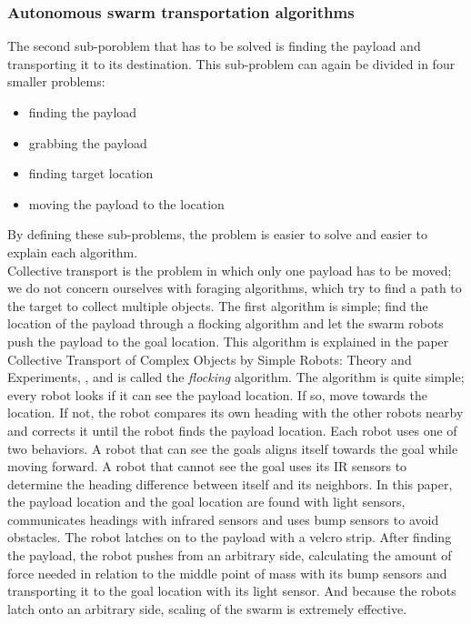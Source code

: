 \subsubsection{Autonomous swarm transportation algorithms}
The second sub-poroblem that has to be solved is finding the payload and transporting it to its destination.
This sub-problem can again be divided in four smaller problems:

\begin{itemize}
	\item finding the payload
	\item grabbing the payload
	\item finding target location
	\item moving the payload to the location
\end{itemize}

By defining these sub-problems, the problem is easier to solve and easier to explain each algorithm. \\

Collective transport is the problem in which only one payload has to be moved; we do not concern ourselves with foraging algorithms, which try to find a path to the target to collect multiple objects.
The first algorithm is simple; find the location of the payload through a flocking algorithm and let the swarm robots push the payload to the goal location. 
This algorithm is explained in the paper Collective Transport of Complex Objects by Simple Robots: Theory and Experiments, \cite{Rubenstein2013collecive}, and is called the \emph{flocking} algorithm.
The algorithm is quite simple; every robot looks if it can see the payload location. If so, move towards the location. If not, the robot compares its own heading with the other robots nearby and corrects it until the robot finds the payload location.
Each robot uses one of two behaviors.
 A robot that can see the goals aligns itself towards the goal while moving forward.
 A robot that cannot see the goal uses its IR sensors to determine the heading difference between itself and its neighbors.
 In this paper, the payload location and the goal location are found with light sensors, communicates headings with infrared sensors and uses bump sensors to avoid obstacles. 
The robot latches on to the payload with a velcro strip.
After finding the payload, the robot pushes from an arbitrary side, calculating the amount of force needed in relation to the middle point of mass with its bump sensors and transporting it to the goal location with its light sensor.  
And because the robots latch onto an arbitrary side, scaling of the swarm is extremely effective. \\ 

